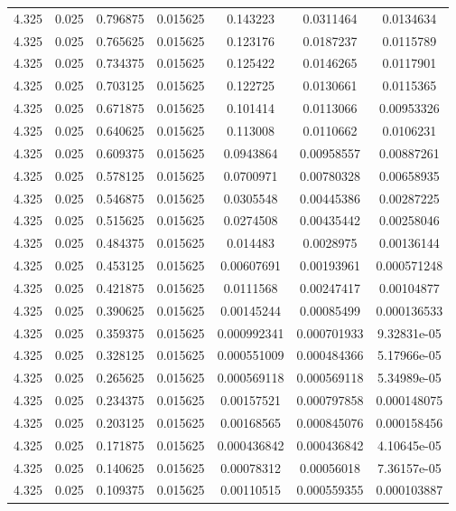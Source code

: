 \begin{flushleft}
\begin{longtable}{ccccccc}
4.325 & 0.025 & 0.796875 & 0.015625 & 0.143223 & 0.0311464 & 0.0134634  \\ 
4.325 & 0.025 & 0.765625 & 0.015625 & 0.123176 & 0.0187237 & 0.0115789  \\ 
4.325 & 0.025 & 0.734375 & 0.015625 & 0.125422 & 0.0146265 & 0.0117901  \\ 
4.325 & 0.025 & 0.703125 & 0.015625 & 0.122725 & 0.0130661 & 0.0115365  \\ 
4.325 & 0.025 & 0.671875 & 0.015625 & 0.101414 & 0.0113066 & 0.00953326  \\ 
4.325 & 0.025 & 0.640625 & 0.015625 & 0.113008 & 0.0110662 & 0.0106231  \\ 
4.325 & 0.025 & 0.609375 & 0.015625 & 0.0943864 & 0.00958557 & 0.00887261  \\ 
4.325 & 0.025 & 0.578125 & 0.015625 & 0.0700971 & 0.00780328 & 0.00658935  \\ 
4.325 & 0.025 & 0.546875 & 0.015625 & 0.0305548 & 0.00445386 & 0.00287225  \\ 
4.325 & 0.025 & 0.515625 & 0.015625 & 0.0274508 & 0.00435442 & 0.00258046  \\ 
4.325 & 0.025 & 0.484375 & 0.015625 & 0.014483 & 0.0028975 & 0.00136144  \\ 
4.325 & 0.025 & 0.453125 & 0.015625 & 0.00607691 & 0.00193961 & 0.000571248  \\ 
4.325 & 0.025 & 0.421875 & 0.015625 & 0.0111568 & 0.00247417 & 0.00104877  \\ 
4.325 & 0.025 & 0.390625 & 0.015625 & 0.00145244 & 0.00085499 & 0.000136533  \\ 
4.325 & 0.025 & 0.359375 & 0.015625 & 0.000992341 & 0.000701933 & 9.32831e-05  \\ 
4.325 & 0.025 & 0.328125 & 0.015625 & 0.000551009 & 0.000484366 & 5.17966e-05  \\ 
4.325 & 0.025 & 0.265625 & 0.015625 & 0.000569118 & 0.000569118 & 5.34989e-05  \\ 
4.325 & 0.025 & 0.234375 & 0.015625 & 0.00157521 & 0.000797858 & 0.000148075  \\ 
4.325 & 0.025 & 0.203125 & 0.015625 & 0.00168565 & 0.000845076 & 0.000158456  \\ 
4.325 & 0.025 & 0.171875 & 0.015625 & 0.000436842 & 0.000436842 & 4.10645e-05  \\ 
4.325 & 0.025 & 0.140625 & 0.015625 & 0.00078312 & 0.00056018 & 7.36157e-05  \\ 
4.325 & 0.025 & 0.109375 & 0.015625 & 0.00110515 & 0.000559355 & 0.000103887  \\ 

\end{longtable}
\end{flushleft}
